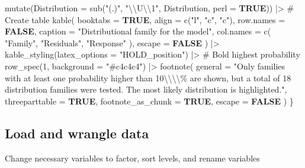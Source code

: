 \documentclass[
  bookmarksnumbered]{article}
\newenvironment{Shaded}{\begin{snugshade}}{\end{snugshade}}
\newcommand{\AttributeTok}[1]{\textcolor[rgb]{0.80,0.80,0.80}{#1}}
\newcommand{\CommentTok}[1]{\textcolor[rgb]{0.50,0.62,0.50}{#1}}
\newcommand{\ConstantTok}[1]{\textcolor[rgb]{0.86,0.64,0.64}{\textbf{#1}}}
\newcommand{\DecValTok}[1]{\textcolor[rgb]{0.86,0.86,0.80}{#1}}
\newcommand{\FunctionTok}[1]{\textcolor[rgb]{0.94,0.94,0.56}{#1}}
\newcommand{\NormalTok}[1]{\textcolor[rgb]{0.80,0.80,0.80}{#1}}
\newcommand{\SpecialCharTok}[1]{\textcolor[rgb]{0.86,0.64,0.64}{#1}}
\newcommand{\StringTok}[1]{\textcolor[rgb]{0.80,0.58,0.58}{#1}}
\begin{document}
\begin{Shaded}
\begin{Highlighting}[]
    \FunctionTok{mutate}\NormalTok{(}\AttributeTok{Distribution =} \FunctionTok{sub}\NormalTok{(}\StringTok{"(.)"}\NormalTok{, }\StringTok{"}\SpecialCharTok{\textbackslash{}\textbackslash{}}\StringTok{U}\SpecialCharTok{\textbackslash{}\textbackslash{}}\StringTok{1"}\NormalTok{, Distribution, }\AttributeTok{perl =} \ConstantTok{TRUE}\NormalTok{)) }\SpecialCharTok{|\textgreater{}}
    \CommentTok{\# Create table}
    \FunctionTok{kable}\NormalTok{(}
      \AttributeTok{booktabs =} \ConstantTok{TRUE}\NormalTok{,}
      \AttributeTok{align =} \FunctionTok{c}\NormalTok{(}\StringTok{"l"}\NormalTok{, }\StringTok{"c"}\NormalTok{, }\StringTok{"c"}\NormalTok{),}
      \AttributeTok{row.names =} \ConstantTok{FALSE}\NormalTok{,}
      \AttributeTok{caption =} \StringTok{"Distributional family for the model"}\NormalTok{,}
      \AttributeTok{col.names =} \FunctionTok{c}\NormalTok{(}
        \StringTok{"Family"}\NormalTok{,}
        \StringTok{"Residuals"}\NormalTok{,}
        \StringTok{"Response"}
\NormalTok{      ),}
      \AttributeTok{escape =} \ConstantTok{FALSE}
\NormalTok{    ) }\SpecialCharTok{|\textgreater{}}
    \FunctionTok{kable\_styling}\NormalTok{(}\AttributeTok{latex\_options =} \StringTok{"HOLD\_position"}\NormalTok{) }\SpecialCharTok{|\textgreater{}}
    \CommentTok{\# Bold highest probability}
    \FunctionTok{row\_spec}\NormalTok{(}\DecValTok{1}\NormalTok{, }\AttributeTok{background =} \StringTok{"\#c4c4c4"}\NormalTok{) }\SpecialCharTok{|\textgreater{}}
    \FunctionTok{footnote}\NormalTok{(}
      \AttributeTok{general =} \StringTok{"Only families with at least one probability higher than}
\StringTok{  10}\SpecialCharTok{\textbackslash{}\textbackslash{}\textbackslash{}\textbackslash{}}\StringTok{\% are shown, but a total of 18 distribution families were tested.}
\StringTok{  The most likely distribution is highlighted."}\NormalTok{,}
      \AttributeTok{threeparttable =} \ConstantTok{TRUE}\NormalTok{,}
      \AttributeTok{footnote\_as\_chunk =} \ConstantTok{TRUE}\NormalTok{,}
      \AttributeTok{escape =} \ConstantTok{FALSE}
\NormalTok{    )}
\NormalTok{\}}
\end{Highlighting}
\end{Shaded}

\subsection{Load and wrangle data}\label{load-and-wrangle-data}

Change necessary variables to factor, sort levels, and rename variables
\end{document}
